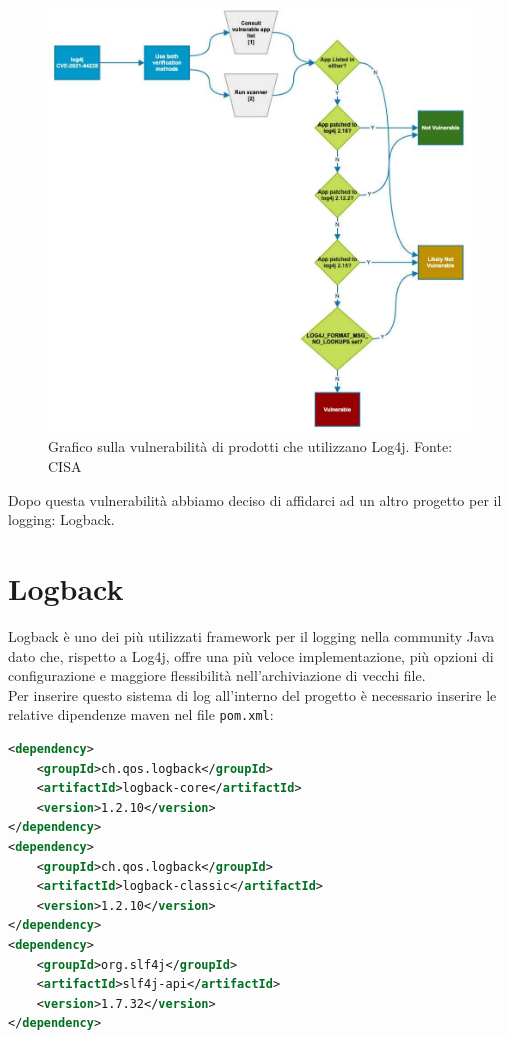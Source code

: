 \begin{figure}[H]
    \centering
    \includegraphics[width=1\textwidth]{images/log4j-bug.pdf}
    \caption{Grafico sulla vulnerabilità di prodotti che utilizzano Log4j. Fonte: CISA}
\end{figure}

Dopo questa vulnerabilità abbiamo deciso di affidarci ad un altro progetto per il logging: Logback.

\section{Logback}

Logback \cite{logback} è uno dei più utilizzati framework per il logging nella community Java dato che, rispetto a Log4j, offre una più veloce implementazione, più opzioni di configurazione e maggiore flessibilità  nell'archiviazione di vecchi file.\\
Per inserire questo sistema di log all'interno del progetto è necessario inserire le relative dipendenze maven nel file \texttt{pom.xml}:
\begin{lstlisting}[language=XML, caption=Dipendenze Maven Logback, basicstyle=\footnotesize]
<dependency>
    <groupId>ch.qos.logback</groupId>
    <artifactId>logback-core</artifactId>
    <version>1.2.10</version>
</dependency>
<dependency>
    <groupId>ch.qos.logback</groupId>
    <artifactId>logback-classic</artifactId>
    <version>1.2.10</version>
</dependency>
<dependency>
    <groupId>org.slf4j</groupId>
    <artifactId>slf4j-api</artifactId>
    <version>1.7.32</version>
</dependency>
\end{lstlisting}

